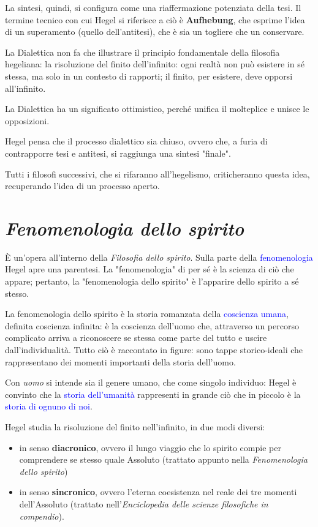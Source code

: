 \documentclass[a4paper, twoside, titlepage]{book}
\renewcommand{\emph}[1]{\textcolor{blue}{#1}}
\begin{document}
La sintesi, quindi, si configura come una riaffermazione potenziata della tesi. Il termine tecnico con cui Hegel si riferisce a ciò è \textbf{Aufhebung}, che esprime l'idea di un superamento (quello dell'antitesi), che è sia un togliere che un conservare.

La Dialettica non fa che illustrare il principio fondamentale della filosofia hegeliana: la risoluzione del finito dell'infinito: ogni realtà non può esistere in sé stessa, ma solo in un contesto di rapporti; il finito, per esistere, deve opporsi all'infinito.

La Dialettica ha un significato ottimistico, perché unifica il molteplice e unisce le opposizioni.

Hegel pensa che il processo dialettico sia chiuso, ovvero che, a furia di contrapporre tesi e antitesi, si raggiunga una sintesi "finale".

Tutti i filosofi successivi, che si rifaranno all'hegelismo, criticheranno questa idea, recuperando l'idea di un processo aperto.

\chapter{\textit{Fenomenologia dello spirito}}

È un’opera all’interno della \textit{Filosofia dello spirito}. Sulla parte della \emph{fenomenologia} Hegel apre una parentesi.
La "fenomenologia" di per sé è la scienza di ciò che appare; pertanto, la "fenomenologia dello spirito" è l'apparire dello spirito a sé stesso.

La fenomenologia dello spirito è la storia romanzata della \emph{coscienza umana}, definita coscienza infinita: è la coscienza dell’uomo che, attraverso un percorso complicato arriva a riconoscere se stessa come parte del tutto e uscire dall’individualità.
Tutto ciò è raccontato in figure: sono tappe storico-ideali che rappresentano dei momenti importanti della storia dell’uomo.

Con \textit{uomo} si intende sia il genere umano, che come singolo individuo: Hegel è convinto che la \emph{storia dell’umanità} rappresenti in grande ciò che in piccolo è la \emph{storia di ognuno di noi}.

Hegel studia la risoluzione del finito nell'infinito, in due modi diversi:
\begin{itemize}
\item in senso \textbf{diacronico}, ovvero il lungo viaggio che lo spirito compie per comprendere se stesso quale Assoluto (trattato appunto nella \textit{Fenomenologia dello spirito})
\item in senso \textbf{sincronico}, ovvero l'eterna coesistenza nel reale dei tre momenti dell'Assoluto (trattato nell'\textit{Enciclopedia delle scienze filosofiche in compendio}).
\end{itemize}
\end{document}
